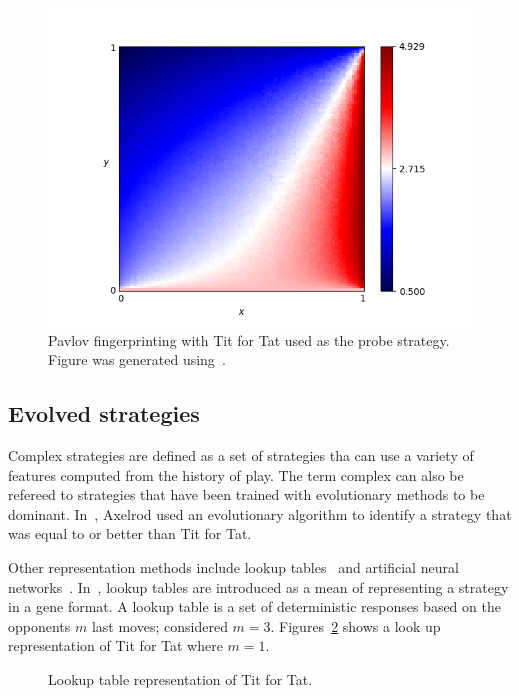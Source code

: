 \documentclass{article}
\begin{document}
\begin{figure}[!hbtp]
    \centering
    \includegraphics[height=.3\textheight]{./assets/images/Win-Stay_Lose-Shift.png}
    \caption{Pavlov fingerprinting with Tit for Tat used as the probe strategy.
    Figure was generated using~\cite{axelrodproject}.}
    \label{fig:fingerprinting}
\end{figure}

\subsection{Evolved strategies}

Complex strategies are defined as a set of strategies tha can use a variety of 
features computed from the history of play. The term complex can also be
refereed to strategies that have been trained with evolutionary methods to 
be dominant. In~\cite{Axelrod1987}, Axelrod used an evolutionary algorithm to 
identify a strategy that was equal to or better than Tit for Tat.

Other representation methods include lookup tables~\cite{Axelrod1987, Lindgren1994}
and artificial neural networks~\cite{Fogel1996, Lee2015}. In~\cite{Axelrod1987},
lookup tables are introduced as a mean of representing a strategy in a gene 
format. A lookup table is a set of deterministic responses based on the
opponents \(m\) last moves; \cite{Axelrod1987} considered \(m=3\).
Figures~\ref{fig:tit_for_tat_lu} shows a look up representation of Tit for Tat
where \(m=1\).

\begin{figure}[!hbtp]
    \centering
    
    \caption{Lookup table representation of Tit for Tat.}
    \label{fig:tit_for_tat_lu}
\end{figure}
\end{document}
